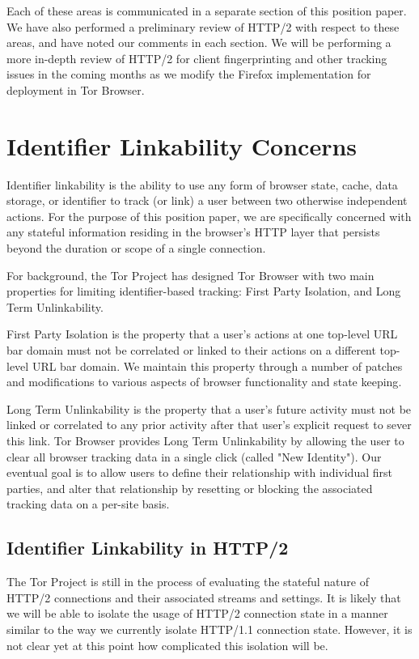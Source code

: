 \documentclass[letterpaper,11pt]{llncs}
\begin{document}
Each of these areas is communicated in a separate section of this position
paper. We have also performed a preliminary review of HTTP/2 with respect to
these areas, and have noted our comments in each section. We will be
performing a more in-depth review of HTTP/2 for client fingerprinting and
other tracking issues in the coming months as we modify the Firefox
implementation for deployment in Tor Browser.

\section{Identifier Linkability Concerns}

Identifier linkability is the ability to use any form of browser state, cache,
data storage, or identifier to track (or link) a user between two otherwise
independent actions. For the purpose of this position paper, we are
specifically concerned with any stateful information residing in the browser's
HTTP layer that persists beyond the duration or scope of a single connection.

For background, the Tor Project has designed Tor Browser with two main
properties for limiting identifier-based tracking: First Party Isolation, and
Long Term Unlinkability.

First Party Isolation is the property that a user's actions at one
top-level URL bar domain must not be correlated or linked to their actions on a
different top-level URL bar domain. We maintain this property through a number
of patches and modifications to various aspects of browser functionality and
state keeping\cite{torbrowser-identifiers}.

Long Term Unlinkability is the property that a user's future activity must not
be linked or correlated to any prior activity after that user's explicit
request to sever this link. Tor Browser provides Long Term Unlinkability by
allowing the user to clear all browser tracking data in a single click (called
"New Identity")\cite{torbrowser-longterm}. Our eventual goal is to allow
users to define their relationship with individual first parties, and alter
that relationship by resetting or blocking the associated tracking data on a
per-site basis.

\subsection{Identifier Linkability in HTTP/2}

The Tor Project is still in the process of evaluating the stateful nature of
HTTP/2 connections and their associated streams and settings. It is likely
that we will be able to isolate the usage of HTTP/2 connection state in a
manner similar to the way we currently isolate HTTP/1.1 connection state.
However, it is not clear yet at this point how complicated this isolation will
be.
\end{document}
